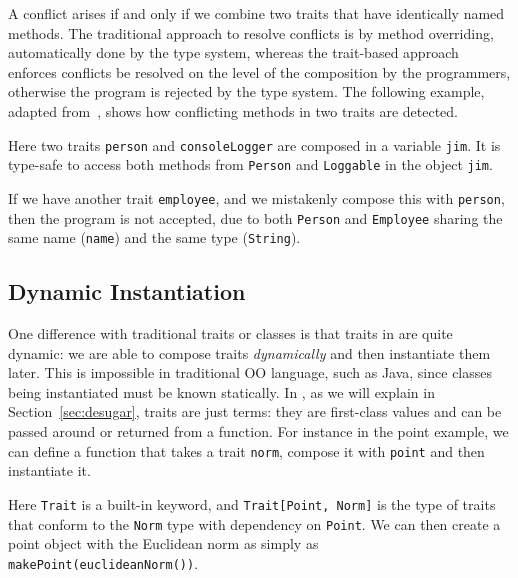 A conflict arises if and only if we combine two traits that have identically
named methods. The traditional approach to resolve conflicts is by method
overriding, automatically done by the type system, whereas the trait-based
approach enforces conflicts be resolved on the level of the composition by the
programmers, otherwise the program is rejected by the type system. The following
example, adapted from~\citet{alpuimdisjoint}, shows how conflicting methods in
two traits are detected.


Here two traits \lstinline{person} and \lstinline{consoleLogger} are composed in
a variable \lstinline{jim}. It is type-safe to access both methods from
\lstinline{Person} and \lstinline{Loggable} in the object \lstinline{jim}.

If we have another trait \lstinline{employee}, and we mistakenly compose this
with \lstinline$person$, then the program is not accepted, due to both
\lstinline{Person} and \lstinline{Employee} sharing the same name (\lstinline{name})
and the same type (\lstinline$String$).



\subsection{Dynamic Instantiation}

One difference with traditional traits or classes is that traits in \name are
quite dynamic: we are able to compose traits \textit{dynamically} and then
instantiate them later. This is impossible in traditional OO language, such as
Java, since classes being instantiated must be known statically. In \name, as we
will explain in Section~\ref{sec:desugar}, traits are just terms: they are
first-class values and can be passed around or returned from a function. For
instance in the point example, we can define a function that takes a trait
\lstinline$norm$, compose it with \lstinline{point} and then instantiate it.

Here \lstinline{Trait} is a built-in keyword, and \lstinline$Trait[Point, Norm]$
is the type of traits that conform to the \lstinline$Norm$ type with dependency
on \lstinline$Point$. We can then create a point object with the Euclidean norm
as simply as \lstinline$makePoint(euclideanNorm())$.




